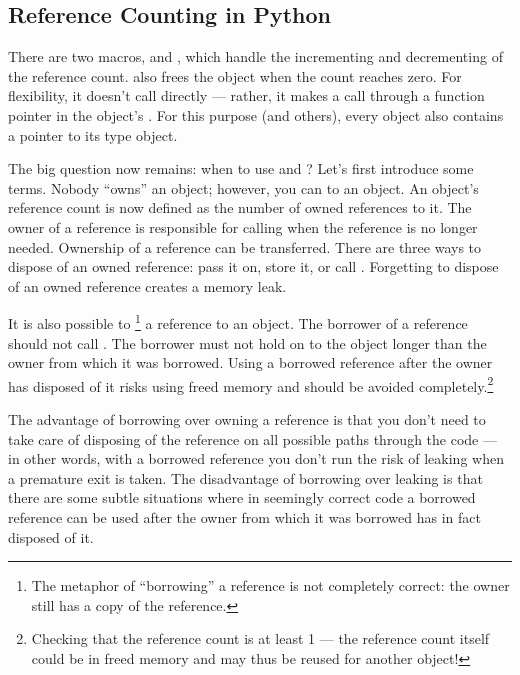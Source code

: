 \subsection{Reference Counting in Python
            \label{refcountsInPython}}

There are two macros,  and ,
which handle the incrementing and decrementing of the reference count.
 also frees the object when the count reaches zero.
For flexibility, it doesn't call  directly --- rather, it
makes a call through a function pointer in the object's .  For this purpose (and others), every object also contains a
pointer to its type object.

The big question now remains: when to use  and
?  Let's first introduce some terms.  Nobody
``owns'' an object; however, you can  to an
object.  An object's reference count is now defined as the number of
owned references to it.  The owner of a reference is responsible for
calling  when the reference is no longer
needed.  Ownership of a reference can be transferred.  There are three
ways to dispose of an owned reference: pass it on, store it, or call
.  Forgetting to dispose of an owned reference
creates a memory leak.

It is also possible to \footnote{The metaphor of
``borrowing'' a reference is not completely correct: the owner still
has a copy of the reference.} a reference to an object.  The borrower
of a reference should not call .  The borrower must
not hold on to the object longer than the owner from which it was
borrowed.  Using a borrowed reference after the owner has disposed of
it risks using freed memory and should be avoided
completely.\footnote{Checking that the reference count is at least 1
 --- the reference count itself could be in
freed memory and may thus be reused for another object!}

The advantage of borrowing over owning a reference is that you don't
need to take care of disposing of the reference on all possible paths
through the code --- in other words, with a borrowed reference you
don't run the risk of leaking when a premature exit is taken.  The
disadvantage of borrowing over leaking is that there are some subtle
situations where in seemingly correct code a borrowed reference can be
used after the owner from which it was borrowed has in fact disposed
of it.


